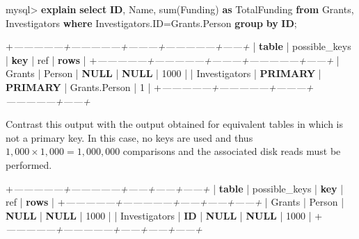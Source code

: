 \documentclass[]{krantz}
\newenvironment{Shaded}{\begin{snugshade}}{\end{snugshade}}
\newcommand{\KeywordTok}[1]{\textcolor[rgb]{0.13,0.29,0.53}{\textbf{#1}}}
\newcommand{\DecValTok}[1]{\textcolor[rgb]{0.00,0.00,0.81}{#1}}
\newcommand{\CommentTok}[1]{\textcolor[rgb]{0.56,0.35,0.01}{\textit{#1}}}
\newcommand{\FunctionTok}[1]{\textcolor[rgb]{0.00,0.00,0.00}{#1}}
\newcommand{\NormalTok}[1]{#1}
\begin{document}
\begin{Shaded}
\begin{Highlighting}[]
\NormalTok{mysql> }\KeywordTok{explain} \KeywordTok{select} \KeywordTok{ID}\NormalTok{, Name, }\FunctionTok{sum}\NormalTok{(Funding) }\KeywordTok{as}\NormalTok{ TotalFunding}
       \KeywordTok{from}\NormalTok{ Grants, Investigators}
       \KeywordTok{where}\NormalTok{ Investigators.ID=Grants.Person }\KeywordTok{group} \KeywordTok{by} \KeywordTok{ID}\NormalTok{;}

\NormalTok{+}\CommentTok{---------------+---------------+---------+---------------+------+}
\NormalTok{| }\KeywordTok{table}\NormalTok{         | possible_keys | }\KeywordTok{key}\NormalTok{     | }\FunctionTok{ref}\NormalTok{           | }\KeywordTok{rows}\NormalTok{ |}
\NormalTok{+}\CommentTok{---------------+---------------+---------+---------------+------+}
\NormalTok{| Grants        | Person        | }\KeywordTok{NULL}\NormalTok{    | }\KeywordTok{NULL}\NormalTok{          | }\DecValTok{1000}\NormalTok{ |}
\NormalTok{| Investigators | }\KeywordTok{PRIMARY}\NormalTok{       | }\KeywordTok{PRIMARY}\NormalTok{ | Grants.Person |    }\DecValTok{1}\NormalTok{ |}
\NormalTok{+}\CommentTok{---------------+---------------+---------+---------------+------+}
\end{Highlighting}
\end{Shaded}

Contrast this output with the output obtained for equivalent tables in
which is not a primary key. In this case, no keys are used and thus
\(1{,}000\times 1{,}000=1{,}000{,}000\) comparisons and the associated
disk reads must be performed.

\begin{Shaded}
\begin{Highlighting}[]
\NormalTok{+}\CommentTok{---------------+---------------+------+------+------+}
\NormalTok{| }\KeywordTok{table}\NormalTok{         | possible_keys | }\KeywordTok{key}\NormalTok{  | }\FunctionTok{ref}\NormalTok{  | }\KeywordTok{rows}\NormalTok{ |}
\NormalTok{+}\CommentTok{---------------+---------------+------+------+------+}
\NormalTok{| Grants        | Person        | }\KeywordTok{NULL}\NormalTok{ | }\KeywordTok{NULL}\NormalTok{ | }\DecValTok{1000}\NormalTok{ |}
\NormalTok{| Investigators | }\KeywordTok{ID}\NormalTok{            | }\KeywordTok{NULL}\NormalTok{ | }\KeywordTok{NULL}\NormalTok{ | }\DecValTok{1000}\NormalTok{ |}
\NormalTok{+}\CommentTok{---------------+---------------+------+------+------+}
\end{Highlighting}
\end{Shaded}
\end{document}
